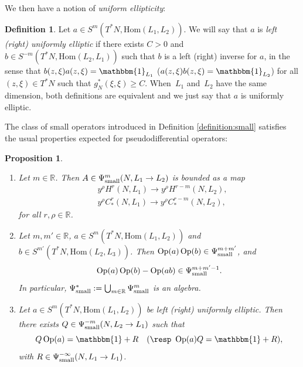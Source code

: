 \documentclass[JEP,XML,SOM,Unicode,NoFloatCountersInSection]{cedram}
\newcommand{\R}{\mathbb{R}}
\DeclareMathOperator{\Op}{Op}
\theoremstyle{plain}
\newtheorem{proposition}{Proposition}[section]
\theoremstyle{definition}
\newtheorem{definition}{Definition}[section]
\begin{document}
We then have a notion of \emph{uniform ellipticity}:

\begin{definition}\label{def:elliptic}
Let $a\in S^m(T^\ast N,\mathrm{Hom}(L_1,L_2))$. We will say that $a$ is \emph{left (\resp right) uniformly elliptic} if there exists $C > 0$ and $b\in S^{-m}(T^\ast N,\mathrm{Hom}(L_2,L_1))$ such that $b$ is a left (\resp right) inverse for $a$, in the sense that $b(z,\xi)a(z,\xi) = \mathbbm{1}_{L_1}$ (\resp $a(z,\xi)b(z,\xi) = \mathbbm{1}_{L_2}$) for all $(z,\xi) \in T^*N$ such that $g_N^*(\xi,\xi) \geq C$. When~$L_1$ and~$L_2$ have the same dimension, both definitions are equivalent and we just say that $a$ is uniformly elliptic.
\end{definition}

The class of small operators introduced in Definition \ref{definition:small} satisfies the usual properties expected for pseudodifferential operators:

\skpt
\begin{proposition}\label{prop:microlocal-calculus}
\begin{enumerate}
\item Let $m \in \R$. Then $A \in \Psi^m_{\textup{small}}(N, L_1\to L_2)$ is bounded as a map
\[
\begin{split}
&y^\rho H^r(N,L_1) \to y^\rho H^{r-m}(N,L_2), \\
& y^\rho C^r_*(N,L_1) \to y^\rho C^{r-m}_*(N,L_2),
\end{split}
\]
for all $r,\rho\in \R$.
\item Let $m, m' \in \R$, $a\in S^m(T^\ast N,\mathrm{Hom}(L_1,L_2))$ and $b\in S^{m'}(T^\ast N,\mathrm{Hom}(L_2,L_3))$. Then $\Op(a)\Op(b)\in \Psi^{m+m'}_{\textup{small}}$, and
\[
\Op(a)\Op(b) - \Op(ab) \in \Psi^{m+m' - 1}_{\textup{small}}.
\]
In particular, $\Psi^*_{\textup{small}} := \bigcup_{m \in \R} \Psi^m_{\textup{small}}$ is an algebra.

\item Let $a\in S^m(T^\ast N, \mathrm{Hom}(L_1,L_2))$ be left (\resp right) uniformly elliptic. Then there exists $Q \in \Psi^{-m}_{\textup{small}}(N,L_2 \to L_1)$ such that
\[
Q \Op(a) = \mathbbm{1} + R \quad (\text{\resp } \Op(a) Q = \mathbbm{1} + R),
\]
with $R \in \Psi^{-\infty}_{\textup{small}}(N,L_1\to L_1)$.
\end{enumerate}

\end{proposition}
\end{document}
